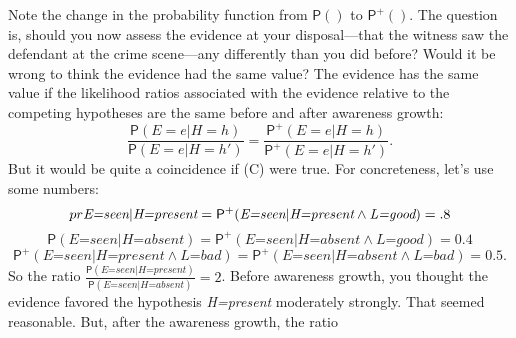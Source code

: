 \documentclass[
  11pt,
  dvipsnames,enabledeprecatedfontcommands]{scrartcl}
\newcommand{\pr}[1]{\ensuremath{\mathsf{P}(#1)}}
\newcommand{\ppr}[2]{\ensuremath{\mathsf{P}^{#1}(#2)}}
\begin{document}
Note the change in the probability function from \(\pr{}\) to
\(\ppr{+}{}\). The question is, should you now assess the evidence at
your disposal---that the witness saw the defendant at the crime
scene---any differently than you did before? Would it be wrong to think
the evidence had the same value? The evidence has the same value if the
likelihood ratios associated with the evidence relative to the competing
hypotheses are the same before and after awareness growth:
\[\frac{\pr{E=e \vert H=h}}{\pr{E=e \vert H=h'}}= \frac{\ppr{+}{E=e \vert H=h}}{\ppr{+}{E=e \vert H=h'}} \tag{C}.\]
But it would be quite a coincidence if (C) were true. For concreteness,
let's use some numbers:
\[\\pr{\textit{E=seen} \vert \textit{H=present}}=\ppr{+}{\textit{E=seen} \vert \textit{H=present} \wedge \textit{L=good}}=.8\]
\[\pr{\textit{E=seen} \vert \textit{H=absent}}=\ppr{+}{\textit{E=seen} \vert \textit{H=absent} \wedge \textit{L=good}}=0.4\]
\[\ppr{+}{\textit{E=seen} \vert \textit{H=present} \wedge \textit{L=bad}} = \ppr{+}{\textit{E=seen} \vert \textit{H=absent} \wedge \textit{L=bad}}=0.5.\]
So the ratio
\(\frac{\pr{\textit{E=seen} \vert \textit{H=present}}}{\pr{\textit{E=seen} \vert \textit{H=absent}}}=2\).
Before awareness growth, you thought the evidence favored the hypothesis
\textit{H=present} moderately strongly. That seemed reasonable. But,
after the awareness growth, the ratio
\end{document}
